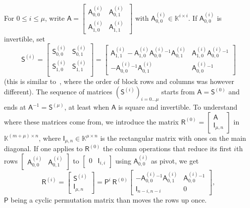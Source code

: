\documentclass[sigconf]{acmart}
\newcommand{\mA}{\ensuremath{\mathsf{A}}}
\newcommand{\mI}{\ensuremath{\mathsf{I}}}
\newcommand{\mP}{\ensuremath{\mathsf{P}}}
\newcommand{\mR}{\ensuremath{\mathsf{R}}}
\newcommand{\mS}{\ensuremath{\mathsf{S}}}
\newcommand{\K}{\ensuremath{\mathbb{K}}}
\newcommand{\mn}{\ensuremath{\mu}}
\theoremstyle{acmdefinition}
\begin{document}
For $0\leq i \leq \mn$, write
$ \mA=\left [\begin{smallmatrix}
    \mA^{(i)}_{0,0} & \mA^{(i)}_{0,1}\ \\[1mm]
    \mA^{(i)}_{1,0} & \mA^{(i)}_{1,1}\
  \end{smallmatrix} \right]$
with $\mA^{(i)}_{0,0} \in \K^{i \times i}$.  If ${\mA^{(i)}_{0,0}}$ is
invertible, set
$$
\mS^{(i)} = 
\begin{bmatrix} 
     \mS^{(i)}_{0,0} & \mS^{(i)}_{0,1}\\
     \mS^{(i)}_{1,0} & \mS^{(i)}_{1,1}\\
\end{bmatrix} = 
\begin{bmatrix} 
  \mA^{(i)}_{1,1} - \mA^{(i)}_{1,0} {\mA^{(i)}_{0,0}}{}^{-1} \mA^{(i)}_{0,1} 
  & 
  \mA^{(i)}_{1,0} {\mA^{(i)}_{0,0}}{}^{-1} 
  \\[1mm]
  -{\mA^{(i)}_{0,0}}{}^{-1} \mA^{(i)}_{0,1}
  &  
  {\mA^{(i)}_{0,0}}{}^{-1} 
\end{bmatrix}
$$
(this 
is similar to~\cite{Cardinal99}, where
the order of block rows and columns was however different). The sequence of
matrices $( \mS^{(i)})_{i=0\dots \mn}$  starts from $\mA=\mS^{(0)}$ and ends at
$\mA^{-1}=\mS^{(\mn)}$, at least when $\mA$ is square and invertible. To
understand where these matrices come from, we introduce the matrix
$ \mR^{(0)} = \left [\begin{smallmatrix}
  \mA \\
  \mI_{\mn, n}
\end{smallmatrix} \right ]
$
in $\K^{(m + \mn) \times n} $, where $\mI_{\mn, n} \in \K^{\mn \times n}$ is
the rectangular matrix with ones on the main diagonal. If one applies to
$\mR^{(0)}$ the column operations that reduce its first $i$th rows
$\left[ \begin{smallmatrix} \mA^{(i)}_{0,0} & \mA^{(i)}_{0,1} \end{smallmatrix} \right ]$ to
$\left [\begin{smallmatrix} 0 & \mI_{i,i} \end{smallmatrix} \right ]$  using $\mA^{(i)}_{0,0}$
as pivot, we get
\begin{equation}\label{eq:Ri}
\mR^{(i)} =
\begin{bmatrix}
  \mS^{(i)} \\
  \mI_{\mu, n}
\end{bmatrix} 
= \mP^i \ \mR^{(0)} 
\begin{bmatrix}
  - \mA_{0, 0}^{(i)} \phantom{}^{- 1} \mA_{0, 1}^{(i)}
  & 
  \mA_{0, 0}^{(i)} \phantom{}^{- 1} \\
 \mI_{n - i,n-i} & 0
\end{bmatrix},
\end{equation}
$\mP$ being a cyclic permutation matrix than moves the rows up once.
\end{document}
